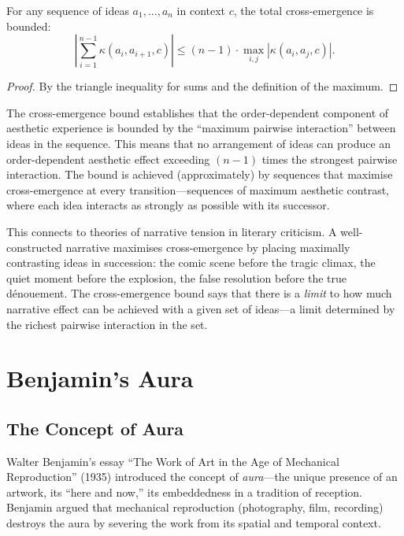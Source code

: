 \begin{theorem}
\label{thm:cross-emergence-bounds}
For any sequence of ideas $a_1, \ldots, a_n$ in context $c$, the total cross-emergence is bounded:
\[
  \left|\sum_{i=1}^{n-1} \kappa(a_i, a_{i+1}, c)\right| \leq (n-1) \cdot \max_{i,j} |\kappa(a_i, a_j, c)|.
\]
\end{theorem}

\begin{proof}
By the triangle inequality for sums and the definition of the maximum.
\end{proof}

\begin{interpretation}
\label{interp:narrative-bound}
The cross-emergence bound establishes that the order-dependent component of aesthetic experience is bounded by the ``maximum pairwise interaction'' between ideas in the sequence.  This means that no arrangement of ideas can produce an order-dependent aesthetic effect exceeding $(n-1)$ times the strongest pairwise interaction.  The bound is achieved (approximately) by sequences that maximise cross-emergence at every transition---sequences of maximum aesthetic contrast, where each idea interacts as strongly as possible with its successor.

This connects to theories of narrative tension in literary criticism.  A well-constructed narrative maximises cross-emergence by placing maximally contrasting ideas in succession: the comic scene before the tragic climax, the quiet moment before the explosion, the false resolution before the true dénouement.  The cross-emergence bound says that there is a \emph{limit} to how much narrative effect can be achieved with a given set of ideas---a limit determined by the richest pairwise interaction in the set.
\end{interpretation}

\section{Benjamin's Aura}
\label{sec:math-aesthetics:aura}

\subsection{The Concept of Aura}

Walter Benjamin's essay ``The Work of Art in the Age of Mechanical
Reproduction'' (1935) introduced the concept of \emph{aura}---the
unique presence of an artwork, its ``here and now,'' its embeddedness
in a tradition of reception.  Benjamin argued that mechanical reproduction
(photography, film, recording) destroys the aura by severing the work
from its spatial and temporal context.

